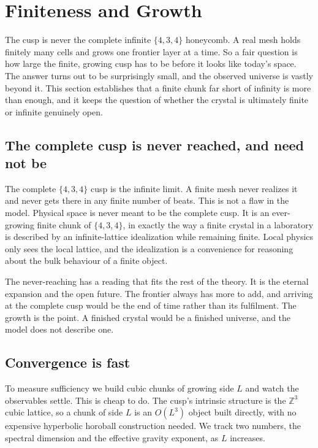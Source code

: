 \section{Finiteness and Growth}

The cusp is never the complete infinite $\{4,3,4\}$ honeycomb. A real mesh holds finitely many cells and grows
one frontier layer at a time. So a fair question is how large the finite, growing cusp has to be before it looks
like today's space. The answer turns out to be surprisingly small, and the observed universe is vastly beyond it.
This section establishes that a finite chunk far short of infinity is more than enough, and it keeps the question
of whether the crystal is ultimately finite or infinite genuinely open.

\subsection{The complete cusp is never reached, and need not be}

The complete $\{4,3,4\}$ cusp is the infinite limit. A finite mesh never realizes it and never gets there in any
finite number of beats. This is not a flaw in the model. Physical space is never meant to be the complete cusp.
It is an ever-growing finite chunk of $\{4,3,4\}$, in exactly the way a finite crystal in a laboratory is
described by an infinite-lattice idealization while remaining finite. Local physics only sees the local lattice,
and the idealization is a convenience for reasoning about the bulk behaviour of a finite object.

The never-reaching has a reading that fits the rest of the theory. It is the eternal expansion and the open
future. The frontier always has more to add, and arriving at the complete cusp would be the end of time rather
than its fulfilment. The growth is the point. A finished crystal would be a finished universe, and the model does
not describe one.

\subsection{Convergence is fast}

To measure sufficiency we build cubic chunks of growing side $L$ and watch the observables settle. This is cheap
to do. The cusp's intrinsic structure is the $\mathbb{Z}^3$ cubic lattice, so a chunk of side $L$ is an
$O(L^3)$ object built directly, with no expensive hyperbolic horoball construction needed. We track two numbers,
the spectral dimension and the effective gravity exponent, as $L$ increases.

